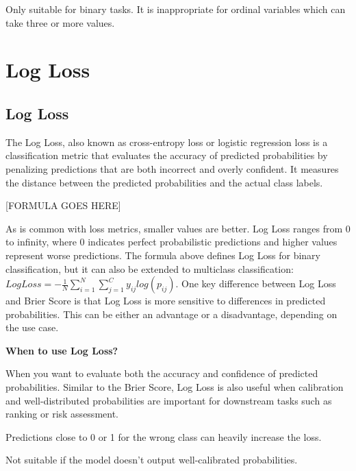 {
\item Only suitable for binary tasks. It is inappropriate for ordinal variables which can take three or more values.
}

\clearpage
\thispagestyle{classificationstyle}
\section{Log Loss}
\subsection{Log Loss}

The Log Loss, also known as cross-entropy loss or logistic regression loss is a classification metric that evaluates the accuracy of predicted probabilities by
penalizing predictions that are both incorrect and overly confident. It measures the distance between the predicted probabilities and the actual class labels.

\begin{center}
    [FORMULA GOES HERE]
\end{center}

As is common with loss metrics, smaller values are better. Log Loss ranges from 0 to infinity, where 0 indicates perfect probabilistic predictions and higher values
represent worse predictions. The formula above defines Log Loss for binary classification, but it can also be extended to multiclass classification:  
$Log Loss = -\frac{1}{N} \sum_{i=1}^{N} \sum_{j=1}^{C} y_{ij} log(p_{ij})$.
One key difference between Log Loss and Brier Score is that Log Loss is more sensitive to differences in predicted probabilities. This can be either an advantage or a
disadvantage, depending on the use case.


\textbf{When to use Log Loss?}

When you want to evaluate both the accuracy and confidence of predicted probabilities. Similar to the Brier Score, Log Loss is also useful when calibration
and well-distributed probabilities are important for downstream tasks such as ranking or risk assessment.

{
    \item Predictions close to 0 or 1 for the wrong class can heavily increase the loss.
    \item Not suitable if the model doesn't output well-calibrated probabilities.
}

